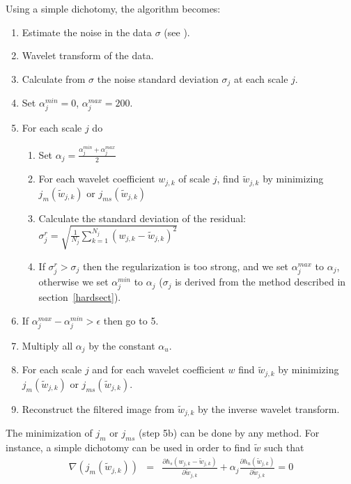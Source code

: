 Using a simple dichotomy, the algorithm becomes:
\begin{enumerate}
\item Estimate the noise in the data $\sigma$ (see \cite{ima:olsen93,starck:sta98_3}).
\item Wavelet transform of the data.
\item Calculate from $\sigma$ the noise standard deviation $\sigma_j$ at each scale $j$.
\item Set $\alpha^{min}_j = 0$, $\alpha^{max}_j = 200$.
\item For each scale $j$ do
\begin{enumerate}
 \item Set $\alpha_j = \frac{\alpha^{min}_j + \alpha^{max}_j}{2}$
 \item For each wavelet coefficient $w_{j,k}$ of scale $j$, 
       find $\tilde w_{j,k}$ by minimizing $j_m(\tilde w_{j,k})$ or $j_{ms}(\tilde w_{j,k})$
  \item Calculate the standard deviation of the residual: \\
 $ \sigma_j^r = \sqrt{ \frac{1}{N_j} \sum_{k=1}^{N_j} (w_{j,k}-\tilde w_{j,k})^2}$
 \item If $\sigma_j^r > \sigma_j$ then the regularization is too strong, and
 we set $\alpha^{max}_j$ to $\alpha_j$, otherwise we 
 set $\alpha^{min}_j$ to $\alpha_j$ ($\sigma_j$ is derived from the
 method described in section~\ref{hardsect}).
\end {enumerate}
\item If $\alpha^{max}_j - \alpha^{min}_j > \epsilon $ then go to 5.
\item Multiply all $\alpha_j$ by the constant $\alpha_u$.
\item For each scale $j$ and for each wavelet coefficient $w$
find $\tilde w_{j,k}$ by minimizing $j_m(\tilde w_{j,k})$ or $j_{ms}(\tilde w_{j,k})$.
\item Reconstruct the filtered image from $\tilde w_{j,k}$ by the inverse wavelet
transform.
\end{enumerate}

The minimization of $j_m$ or $j_{ms}$ (step 5b) can be done by any method. 
For instance,
a simple dichotomy can be used in order to find $\tilde w$ such that
\begin{eqnarray}
\nabla(j_m(\tilde w_{j,k})) & = &
 \frac{\partial h_s(w_{j,k}-\tilde w_{j,k})}{\partial \tilde w_{j,k}} 
 + \alpha_j \frac{\partial h_n(\tilde w_{j,k})}{\partial \tilde w_{j,k}} = 0
\end{eqnarray}

